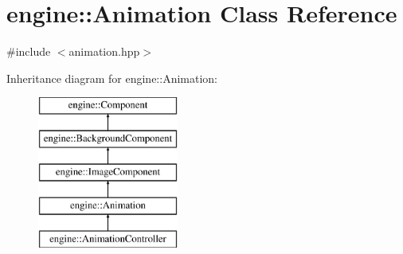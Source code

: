 \hypertarget{classengine_1_1_animation}{}\section{engine\+:\+:Animation Class Reference}
\label{classengine_1_1_animation}


{\ttfamily \#include $<$animation.\+hpp$>$}

Inheritance diagram for engine\+:\+:Animation\+:\begin{figure}[H]
\begin{center}
\leavevmode
\includegraphics[height=5.000000cm]{classengine_1_1_animation}
\end{center}
\end{figure}
